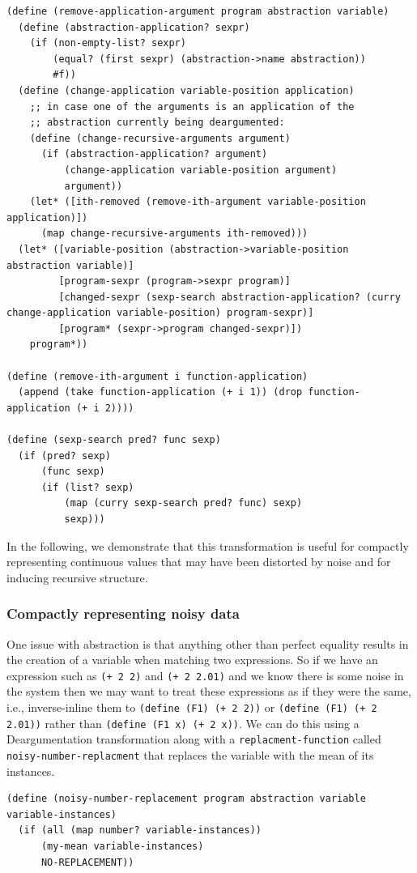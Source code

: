 \documentclass[a4paper,10pt]{article}
\begin{document}
\begin{lstlisting}[frame=trbl]
(define (remove-application-argument program abstraction variable)
  (define (abstraction-application? sexpr)
    (if (non-empty-list? sexpr)
        (equal? (first sexpr) (abstraction->name abstraction))
        #f))
  (define (change-application variable-position application)
    ;; in case one of the arguments is an application of the
    ;; abstraction currently being deargumented:
    (define (change-recursive-arguments argument)
      (if (abstraction-application? argument)
          (change-application variable-position argument)
          argument))
    (let* ([ith-removed (remove-ith-argument variable-position application)])
      (map change-recursive-arguments ith-removed)))
  (let* ([variable-position (abstraction->variable-position abstraction variable)]
         [program-sexpr (program->sexpr program)]
         [changed-sexpr (sexp-search abstraction-application? (curry change-application variable-position) program-sexpr)]
         [program* (sexpr->program changed-sexpr)])
    program*))

(define (remove-ith-argument i function-application)
  (append (take function-application (+ i 1)) (drop function-application (+ i 2))))

(define (sexp-search pred? func sexp)
  (if (pred? sexp)
      (func sexp)
      (if (list? sexp)
          (map (curry sexp-search pred? func) sexp)
          sexp)))
\end{lstlisting}
In the following, we demonstrate that this transformation is useful for compactly representing continuous values that may have been distorted by noise and for inducing recursive structure.

\subsubsection{Compactly representing noisy data}
One issue with abstraction is that anything other than perfect equality results in the creation of a variable when matching two expressions.  So if we have an expression such as \texttt{(+ 2 2)} and \texttt{(+ 2 2.01)} and we know there is some noise in the system then we may want to treat these expressions as if they were the same, i.e., inverse-inline them to \texttt{(define (F1) (+ 2 2))} or \texttt{(define (F1) (+ 2 2.01))} rather than \texttt{(define (F1 x) (+ 2 x))}.  We can do this using a Deargumentation transformation along with a \texttt{replacment-function} called \texttt{noisy-number-replacment} that replaces the variable with the mean of its instances.  
\begin{lstlisting}[frame=trbl]
(define (noisy-number-replacement program abstraction variable variable-instances)
  (if (all (map number? variable-instances))
      (my-mean variable-instances)
      NO-REPLACEMENT))
\end{lstlisting}
\end{document}

